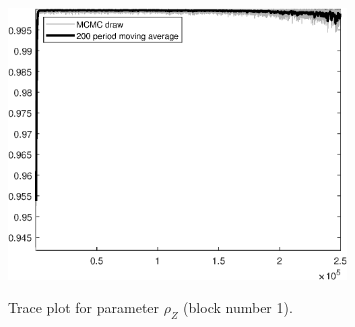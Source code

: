 \begin{figure}[H]
\centering
  \includegraphics[width=0.8\textwidth]{BRS_est_shopping/graphs/TracePlot_rho_Z_blck_1}\\
    \caption{Trace plot for parameter ${\rho_Z}$ (block number 1).}
\end{figure}
